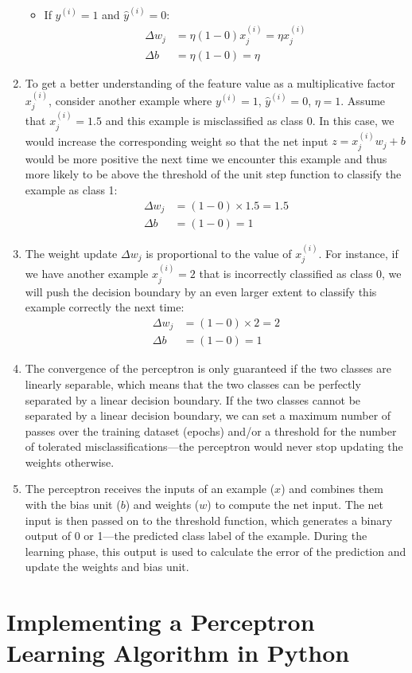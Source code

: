 \documentclass[../machine_learning_scikit.tex]{subfiles}
\begin{document}
\begin{enumerate}
\begin{itemize}
            \item If $y^{(i)} = 1$ and $\hat{y}^{(i)} = 0$:
            \begin{align*}
            \Delta w_j &= \eta(1 - 0)x_j^{(i)} = \eta x_j^{(i)} \\
            \Delta b &= \eta(1 - 0) = \eta
            \end{align*}
        \end{itemize}

        \item To get a better understanding of the feature value as a multiplicative factor $x_j^{(i)}$, consider another example where $y^{(i)} = 1$, $\hat{y}^{(i)} = 0$, $\eta = 1$. Assume that $x_j^{(i)} = 1.5$ and this example is misclassified as class 0. In this case, we would increase the corresponding weight so that the net input $z = x_j^{(i)}w_j + b$ would be more positive the next time we encounter this example and thus more likely to be above the threshold of the unit step function to classify the example as class 1:
        \begin{align*}
        \Delta w_j &= (1 - 0) \times 1.5 = 1.5 \\
        \Delta b &= (1 - 0) = 1
        \end{align*}

        \item The weight update $\Delta w_j$ is proportional to the value of $x_j^{(i)}$. For instance, if we have another example $x_j^{(i)} = 2$ that is incorrectly classified as class 0, we will push the decision boundary by an even larger extent to classify this example correctly the next time:
        \begin{align*}
        \Delta w_j &= (1 - 0) \times 2 = 2 \\
        \Delta b &= (1 - 0) = 1
        \end{align*}

        \item The convergence of the perceptron is only guaranteed if the two classes are linearly separable, which means that the two classes can be perfectly separated by a linear decision boundary. If the two classes cannot be separated by a linear decision boundary, we can set a maximum number of passes over the training dataset (epochs) and/or a threshold for the number of tolerated misclassifications—the perceptron would never stop updating the weights otherwise.

        \item The perceptron receives the inputs of an example ($x$) and combines them with the bias unit ($b$) and weights ($w$) to compute the net input. The net input is then passed on to the threshold function, which generates a binary output of 0 or 1—the predicted class label of the example. During the learning phase, this output is used to calculate the error of the prediction and update the weights and bias unit.
    \end{enumerate}

    \section{Implementing a Perceptron Learning Algorithm in Python}
\end{document}
